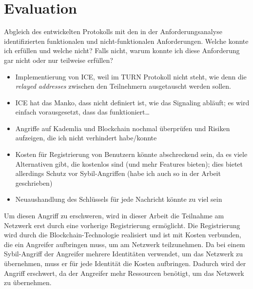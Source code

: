 \chapter{Evaluation}
\label{chap:evaluation}



Abgleich des entwickelten Protokolls mit den in der Anforderungsanalyse identifizierten funktionalen und
nicht-funktionalen Anforderungen. Welche konnte ich erfüllen und welche nicht? Falls nicht, warum
konnte ich diese Anforderung gar nicht oder nur teilweise erfüllen?

\begin{itemize}
    \item Implementierung von ICE, weil im TURN Protokoll nicht steht, wie denn die \textit{relayed addresses} zwischen den Teilnehmern ausgetauscht werden sollen.
    \item ICE hat das Manko, dass nicht definiert ist, wie das Signaling abläuft; es wird einfach vorausgesetzt, dass das funktioniert\dots
    \item Angriffe auf Kademlia und Blockchain nochmal überprüfen und Risiken aufzeigen, die ich nicht verhindert habe/konnte
    \item Kosten für Registrierung von Benutzern könnte abschreckend sein, da es viele Alternativen gibt, die kostenlos sind (und mehr Features bieten); dies bietet allerdings Schutz vor Sybil-Angriffen (habe ich auch so in der Arbeit geschrieben)
    \item Neuaushandlung des Schlüssels für jede Nachricht könnte zu viel sein
\end{itemize}


Um diesen Angriff zu erschweren, wird in dieser Arbeit die Teilnahme am Netzwerk erst durch eine vorherige Registrierung ermöglicht. Die Registrierung wird durch die Blockchain-Technologie realisiert und ist mit Kosten verbunden, die ein Angreifer aufbringen muss, um am Netzwerk teilzunehmen. Da bei einem Sybil-Angriff der Angreifer mehrere Identitäten verwendet, um das Netzwerk zu übernehmen, muss er für jede Identität die Kosten aufbringen. Dadurch wird der Angriff erschwert, da der Angreifer mehr Ressourcen benötigt, um das Netzwerk zu übernehmen.

